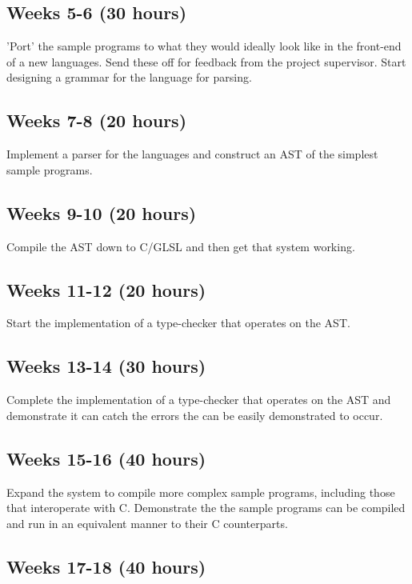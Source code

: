 \documentclass[11pt]{article}
\begin{document}
\subsection{Weeks 5-6 (30 hours)}

'Port' the sample programs to what they would ideally look like in the
front-end of a new languages. Send these off for feedback from the project
supervisor. Start designing a grammar for the language for parsing.

\subsection{Weeks 7-8 (20 hours)}

Implement a parser for the languages and construct an AST of the simplest
sample programs.

\subsection{Weeks 9-10 (20 hours)}

Compile the AST down to C/GLSL and then get that system working.

\subsection{Weeks 11-12 (20 hours)}

Start the implementation of a type-checker that operates on the AST.

\subsection{Weeks 13-14 (30 hours)}

Complete the implementation of a type-checker that operates on the AST and
demonstrate it can catch the errors the can be easily demonstrated to occur.

\subsection{Weeks 15-16 (40 hours)}

Expand the system to compile more complex sample programs, including those that
interoperate with C. Demonstrate the the sample programs can be compiled and
run in an equivalent manner to their C counterparts.

\subsection{Weeks 17-18 (40 hours)}
\end{document}
